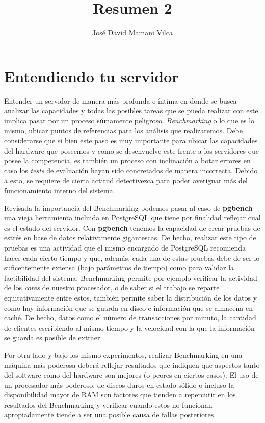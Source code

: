 \documentclass[12pt,conference]{IEEEtran}
\begin{document}
\title{Resumen 2}

\author{José David Mamani Vilca}%

\onecolumn

\maketitle

\section{Entendiendo tu servidor}

Entender un servidor de manera más profunda e íntima en donde se busca analizar las capacidades y todas las posibles tareas que se pueda realizar con este implica pasar por un proceso súmamente peligroso. \textit{Benchmarking} o lo que es lo mismo, ubicar puntos de referencias para los análisis que realizaremos. Debe considerarse que si bien este paso es muy importante para ubicar las capacidades del hardware que poseemos y como se desenvuelve este frente a los servidores que posee la competencia, es también un proceso con inclinación a botar errores en caso los \textit{tests} de evaluación hayan sido concretados de manera incorrecta. Debido a esto, se requiere de cierta actitud detectivezca para poder averiguar más del funcionamiento interno del sistema.

Revisada la importancia del Benchmarking podemos pasar al caso de \textbf{pgbench} una vieja herramienta incluida en PostgreSQL que tiene por finalidad reflejar cual es el estado del servidor. Con \textbf{pgbench} tenemos la capacidad de crear pruebas de estrés en base de datos relativamente gigantescas. De hecho, realizar este tipo de pruebas es una actividad que el mismo encargado de PostgreSQL recomienda hacer cada cierto tiempo y que, además, cada una de estas pruebas debe de ser lo suficentemente extensa (bajo parámetros de tiempo) como para validar la factibilidad del sistema. Benchmarking permite por ejemplo verificar la actividad de los \textit{cores} de nuestro procesador, o de saber si el trabajo se reparte equitativamente entre estos, también permite saber la distribución de los datos y como hay información que se guarda en disco e información que se almacena en caché. De hecho, datos como el número de transacciones por minuto, la cantidad de clientes escribiendo al mismo tiempo y la velocidad con la que la información se guarda es posible de extraer.

Por otra lado y bajo los mismo experimentos, realizar Benchmarking en una máquina más poderosa deberá reflejar resultados que indiquen que aspectos tanto del software como del hardware son mejores (o peores en ciertos casos). El uso de un procesador más poderoso, de discos duros en estado sólido o incluso la disponibilidad mayor de RAM  son factores que tienden a repercutir en los resultados del Benchmarking y verificar cuando estos no funcionan apropiadamente tiende a ser una posible causa de fallas posteriores.
\end{document}

